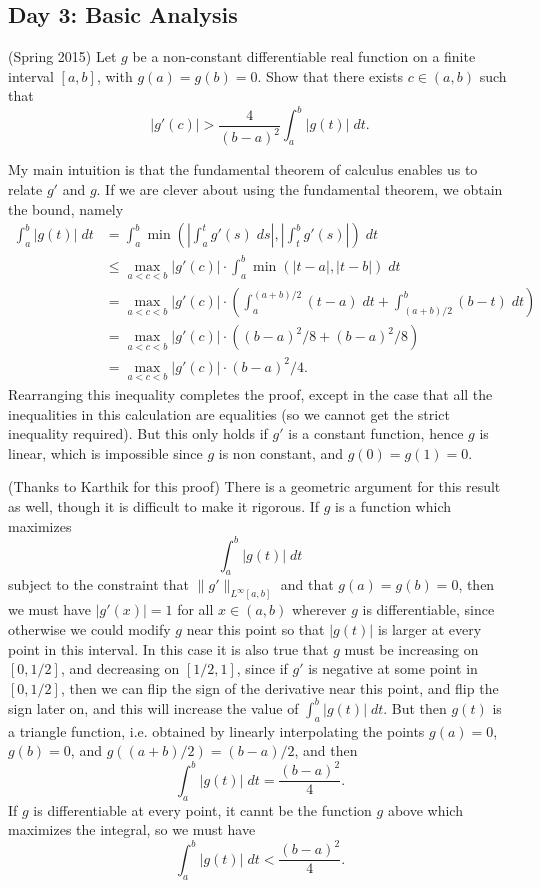 \documentclass{exam}
\theoremstyle{problemstyle}
\newcommand{\1}[1]{\textbf{1}_{\left[#1\right]}} %
\begin{document}
\begin{questions}
\newpage
\section{Day 3: Basic Analysis}

\question (Spring 2015) Let $g$ be a non-constant differentiable real function on a finite interval $[a,b]$, with $g(a) = g(b) = 0$. Show that there exists $c \in (a,b)$ such that
%
\[ |g'(c)| > \frac{4}{(b - a)^2} \int_a^b |g(t)|\; dt. \]
\begin{solution}
	My main intuition is that the fundamental theorem of calculus enables us to relate $g'$ and $g$. If we are clever about using the fundamental theorem, we obtain the bound, namely
	\begin{align*}
		\int_a^b |g(t)|\; dt &= \int_a^b \min \left( \left| \int_a^t g'(s)\; ds \right|, \left| \int_t^b g'(s) \right| \right)\; dt\\
		&\leq \max_{a < c < b} |g'(c)| \cdot \int_a^b \min(|t - a|, |t - b|)\; dt\\
		&= \max_{a < c < b} |g'(c)| \cdot \left( \int_a^{(a + b)/2} (t - a)\; dt + \int_{(a + b)/2}^b (b - t)\; dt \right)\\
		&= \max_{a < c < b} |g'(c)| \cdot \left( (b - a)^2/8 + (b - a)^2/8 \right)\\
		&= \max_{a < c < b} |g'(c)| \cdot (b-a)^2/4.
	\end{align*}
	Rearranging this inequality completes the proof, except in the case that all the inequalities in this calculation are equalities (so we cannot get the strict inequality required). But this only holds if $g'$ is a constant function, hence $g$ is linear, which is impossible since $g$ is non constant, and $g(0) = g(1) = 0$.

	(Thanks to Karthik for this proof) There is a geometric argument for this result as well, though it is difficult to make it rigorous. If $g$ is a function which maximizes
	\[ \int_a^b |g(t)|\; dt \]
	subject to the constraint that $\| g' \|_{L^\infty[a,b]}$ and that $g(a) = g(b) = 0$, then we must have $|g'(x)| = 1$ for all $x \in (a,b)$ wherever $g$ is differentiable, since otherwise we could modify $g$ near this point so that $|g(t)|$ is larger at every point in this interval. In this case it is also true that $g$ must be increasing on $[0,1/2]$, and decreasing on $[1/2,1]$, since if $g'$ is negative at some point in $[0,1/2]$, then we can flip the sign of the derivative near this point, and flip the sign later on, and this will increase the value of $\int_a^b |g(t)|\; dt$. But then $g(t)$ is a triangle function, i.e. obtained by linearly interpolating the points $g(a) = 0$, $g(b) = 0$, and $g((a + b)/2) = (b - a)/2$, and then
	\[ \int_a^b |g(t)|\; dt = \frac{(b - a)^2}{4}. \]
	If $g$ is differentiable at every point, it cannt be the function $g$ above which maximizes the integral, so we must have
	\[ \int_a^b |g(t)|\; dt < \frac{(b - a)^2}{4}. \]
\end{solution}


\end{questions}
\end{document}
